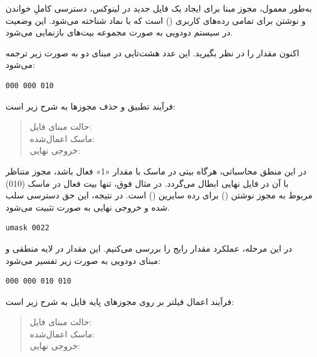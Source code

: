 به‌طور معمول، مجوز مبنا برای ایجاد یک فایل جدید در لینوکس، دسترسی کاملِ خواندن و نوشتن برای تمامی رده‌های کاربری () است که با نماد  شناخته می‌شود. این وضعیت در سیستم دودویی به صورت مجموعه بیت‌های  بازنمایی می‌شود.

اکنون مقدار  را در نظر بگیرید. این عدد هشت‌تایی در مبنای دو به صورت زیر ترجمه می‌شود:

\begin{latin}
\begin{lstlisting}
000 000 010
\end{lstlisting}
\end{latin}

فرآیند تطبیق و حذف مجوزها به شرح زیر است:

\begin{quote}
حالت مبنای فایل: \\
ماسک اعمال‌شده: \\
خروجی نهایی: 
\end{quote}

در این منطق محاسباتی، هرگاه بیتی در ماسک با مقدار «1» فعال باشد، مجوز متناظر با آن در فایل نهایی ابطال می‌گردد. در مثال فوق، تنها بیت فعال در ماسک (010) مربوط به مجوز نوشتن () برای رده سایرین () است. در نتیجه، این حق دسترسی سلب شده و خروجی نهایی به صورت  تثبیت می‌شود.

\begin{latin}
\begin{lstlisting}
umask 0022
\end{lstlisting}
\end{latin}

در این مرحله، عملکرد مقدار رایج  را بررسی می‌کنیم. این مقدار در لایه منطقی و مبنای دودویی به صورت زیر تفسیر می‌شود:

\begin{latin}
\begin{lstlisting}
000 000 010 010
\end{lstlisting}
\end{latin}

فرآیند اعمال فیلتر بر روی مجوزهای پایه فایل به شرح زیر است:

\begin{quote}
حالت مبنای فایل: \\
ماسک اعمال‌شده: \\
خروجی نهایی: 
\end{quote}

